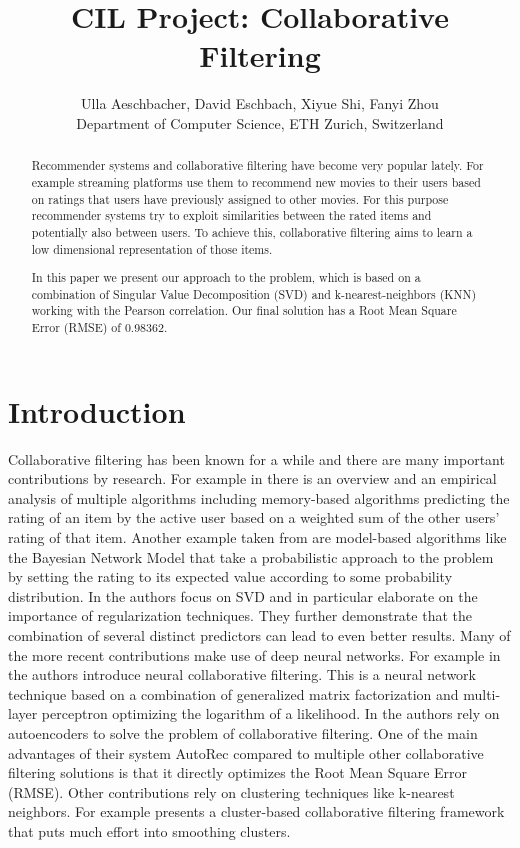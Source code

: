 \documentclass[10pt,conference,compsocconf]{IEEEtran}
\begin{document}
\title{CIL Project: Collaborative Filtering}

\author{
	Ulla Aeschbacher, David Eschbach,  Xiyue Shi, Fanyi Zhou\\
	Department of Computer Science, ETH Zurich, Switzerland
}

\maketitle

\begin{abstract}
Recommender systems and collaborative filtering have become very popular lately. For example streaming platforms use them to recommend new movies to their users based on ratings that users have previously assigned to other movies. For this purpose recommender systems try to exploit similarities between the rated items and potentially also between users. To achieve this, collaborative filtering aims to learn a low dimensional representation of those items.

In this paper we present our approach to the problem, which is based on a combination of Singular Value Decomposition (SVD) and k-nearest-neighbors (KNN) working with the Pearson correlation. Our final solution has a Root Mean Square Error (RMSE) of 0.98362.
\end{abstract}

\section{Introduction}
Collaborative filtering has been known for a while and there are many important contributions by research. For example in \cite{breese} there is an overview and an empirical analysis of multiple algorithms including memory-based algorithms predicting the rating of an item by the active user based on a weighted sum of the other users' rating of that item. Another example taken from \cite{breese} are model-based algorithms like the Bayesian Network Model that take a probabilistic approach to the problem by setting the rating to its expected value according to some probability distribution. In \cite{paterek} the authors focus on SVD and in particular elaborate on the importance of regularization techniques. They further demonstrate that the combination of several distinct predictors can lead to even better results. Many of the more recent contributions make use of deep neural networks. For example in \cite{he} the authors introduce neural collaborative filtering. This is a neural network technique based on a combination of generalized matrix factorization and multi-layer perceptron optimizing the logarithm of a likelihood. In \cite{sedhain} the authors rely on autoencoders to solve the problem of collaborative filtering. One of the main advantages of their system AutoRec compared to multiple other collaborative filtering solutions is that it directly optimizes the Root Mean Square Error (RMSE). Other contributions rely on clustering techniques like k-nearest neighbors. For example \cite{xue} presents a cluster-based collaborative filtering framework that puts much effort into smoothing clusters.
\end{document}

